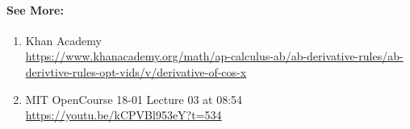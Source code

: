 \documentclass{article}
\theoremstyle{definition}
\begin{document}
\paragraph{See More:}
\begin{enumerate}
	\item {Khan Academy\\
\url{https://www.khanacademy.org/math/ap-calculus-ab/ab-derivative-rules/ab-derivtive-rules-opt-vids/v/derivative-of-cos-x}}
	\item {MIT OpenCourse 18-01 Lecture 03 at 08:54\\
\url{https://youtu.be/kCPVBl953eY?t=534}}
\end{enumerate}
\end{document}
